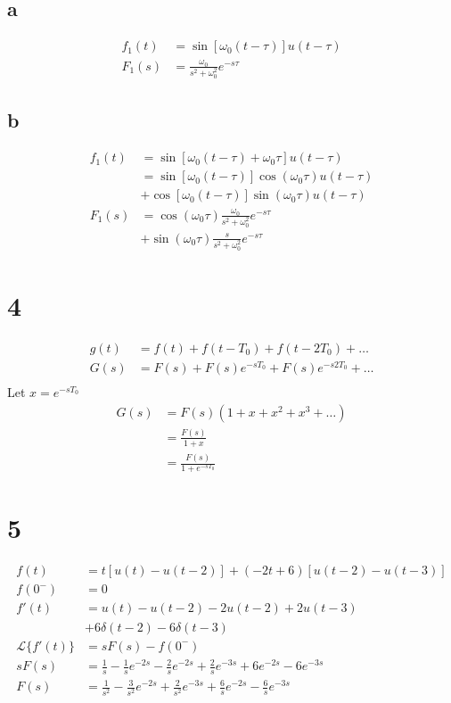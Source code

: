 \documentclass{article}
\begin{document}
\begin{multicols}{2}
\subsection*{a}
\begin{align*}
    f_1(t) &= \sin\left[\omega_0(t-\tau)\right]u(t-\tau)\\
    F_1(s) &= \boxed{\frac{\omega_0}{s^2 + \omega_0^2} e^{-s\tau}}
\end{align*}
\subsection*{b}
\begin{align*}
    f_1(t) &= \sin\left[\omega_0(t-\tau)+\omega_0\tau\right]u(t-\tau)\\
    &= \sin\left[\omega_0(t-\tau)\right]\cos(\omega_0\tau)u(t-\tau)\\
    &+ \cos\left[\omega_0(t-\tau)\right]\sin(\omega_0\tau)u(t-\tau)\\
    F_1(s) &= \cos(\omega_0\tau)\frac{\omega_0}{s^2 + \omega_0^2} e^{-s\tau}\\
    &+ \boxed{\sin(\omega_0\tau)\frac{s}{s^2 + \omega_0^2} e^{-s\tau} }
\end{align*}
\section*{4}
\begin{align*}
    g(t) &= f(t) + f(t-T_0) + f(t-2T_0) + \ldots\\
    G(s) &= F(s) + F(s)e^{-sT_0} + F(s)e^{-s2T_0} + \ldots\\
\end{align*}
Let $x = e^{-sT_0}$
\begin{align*}
    G(s) &= F(s)\left(1+x+x^2+x^3+\ldots\right)\\
    &= \frac{F(s)}{1+x}\\
    &= \boxed{\frac{F(s)}{1+e^{-sT_0}}}
\end{align*}
\section*{5}
\begin{align*}
    f(t) &= t\left[ u(t) - u(t-2) \right] + \left( -2t+6 \right)\left[ u(t-2) - u(t-3) \right]\\
    f(0^{-}) &= 0\\
    f'(t)&= u(t)-u(t-2)-2u(t-2)+2u(t-3)\\
    &+6\delta(t-2)-6\delta(t-3)\\
    \mathcal{L}\{ f'(t)\} &= sF(s)-f(0^-)\\
    sF(s) &= \frac{1}{s} - \frac{1}{s} e^{-2s} - \frac{2}{s} e^{-2s} + \frac{2}{s} e^{-3s} +6e^{-2s} -6e^{-3s}\\
    F(s) &= \boxed{\frac{1}{s^2}-\frac{3}{s^2}e^{-2s}+\frac{2}{s^2}e^{-3s} + \frac{6}{s}e^{-2s} - \frac{6}{s}e^{-3s}}
\end{align*}
\end{multicols}
\end{document}
